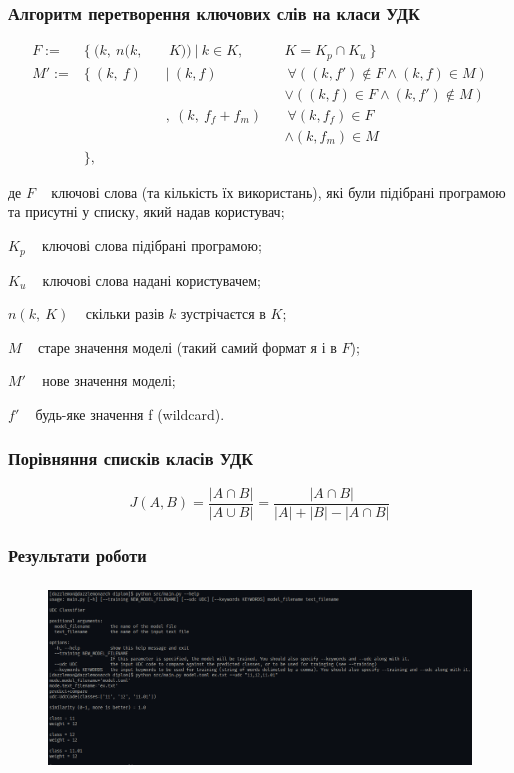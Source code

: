 \documentclass{beamer}
\begin{document}
\begin{frame}
	\frametitle{Алгоритм перетворення ключових слів на класи УДК}
	\begin{equation}
    \begin{alignedat}{3}
      F := &\{~ (k,~ n(k,&&~ K)) ~|~ k \in K,~ &&K = K_p \cap K_u ~\} \\
      M':= &\{~ (k,~ f)  &&|~ (k, f)          &&~\forall ((k, f') \notin F
           \land   (k, f) \in M) \\
           &             &&                    &&\lor   ((k, f) \in F
           \land   (k, f') \notin M) \\
           &             &&,~ (k,~ f_f + f_m) &&~\forall (k, f_f) \in F \\
           &             &&                    &&\land   (k, f_m) \in M \\
           &\},
    \end{alignedat}
	\nonumber
\end{equation}

де $F$ \textemdash~ ключові слова (та кількість їх використань),
      які були підібрані програмою та присутні у списку, який надав користувач;

  $K_p$ \textemdash~ ключові слова підібрані програмою;

  $K_u$ \textemdash~ ключові слова надані користувачем;

  $n(k,~ K)$ \textemdash~ скільки разів $k$ зустрічаєтся в $K$;

  $M$ \textemdash~ старе значення моделі (такий самий формат я і в $F$);

  $M'$ \textemdash~ нове значення моделі;

  $f'$ \textemdash~ будь-яке значення f (wildcard).

\end{frame}

\begin{frame}
	\frametitle{Порівняння списків класів УДК}
	\begin{equation}
    J(A, B) =  \frac{| A \cap B |}{ | A \cup B | }
    = \frac{| A \cap B | }{  |A| + |B| - | A \cap B | }
	\nonumber
\end{equation}
\end{frame}

\begin{frame}
	\frametitle{Результати роботи}
	\begin{figure}
		\centering
		\includegraphics[height=5cm]{example.png}
	\end{figure}
\end{frame}
\end{document}
